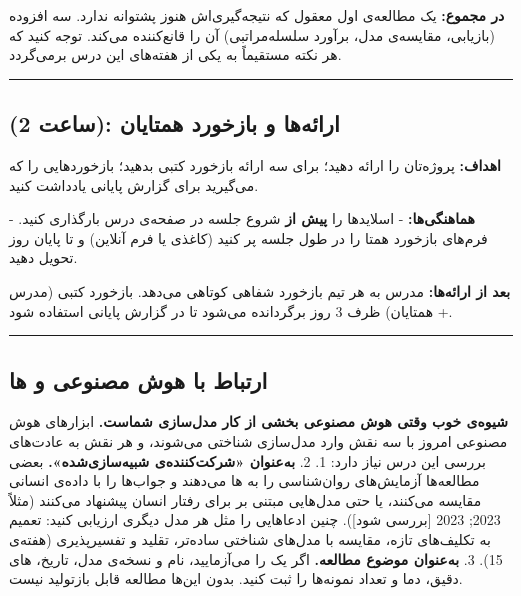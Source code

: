 \textbf{در مجموع:} یک مطالعه‌ی اول معقول که نتیجه‌گیری‌اش هنوز پشتوانه
ندارد. سه افزوده (بازیابی، مقایسه‌ی مدل، برآورد سلسله‌مراتبی) آن را
قانع‌کننده می‌کند. توجه کنید که هر نکته مستقیماً به یکی از هفته‌های این درس
برمی‌گردد.

\begin{center}\rule{0.5\linewidth}{0.5pt}\end{center}

\subsection{\texorpdfstring{ (2 ساعت): ارائه‌ها و بازخورد
همتایان}{lab (2 ساعت): ارائه‌ها و بازخورد همتایان}}

\textbf{اهداف:} پروژه‌تان را ارائه دهید؛ برای سه ارائه بازخورد کتبی
بدهید؛ بازخوردهایی را که می‌گیرید برای گزارش پایانی یادداشت کنید.

\textbf{هماهنگی‌ها:} - اسلایدها  را \textbf{پیش از} شروع جلسه
در صفحه‌ی درس بارگذاری کنید. - فرم‌های بازخورد همتا را در طول جلسه پر کنید
(کاغذی یا فرم آنلاین) و تا پایان روز تحویل دهید.

\textbf{بعد از ارائه‌ها:} مدرس به هر تیم بازخورد شفاهی کوتاهی می‌دهد.
بازخورد کتبی (مدرس + همتایان) ظرف 3 روز برگردانده می‌شود تا در گزارش
پایانی استفاده شود.

\begin{center}\rule{0.5\linewidth}{0.5pt}\end{center}

\subsection{\texorpdfstring{ارتباط با هوش مصنوعی و
ها}{ارتباط با هوش مصنوعی و LLMها}}

\textbf{شیوه‌ی خوب وقتی هوش مصنوعی بخشی از کار مدل‌سازی شماست.} ابزارهای
هوش مصنوعی امروز با سه نقش وارد مدل‌سازی شناختی می‌شوند، و هر نقش به
عادت‌های بررسی این درس نیاز دارد: 1. 2. \textbf{به‌عنوان «شرکت‌کننده‌ی
شبیه‌سازی‌شده».} بعضی مطالعه‌ها آزمایش‌های روان‌شناسی را به ها می‌دهند
و جواب‌ها را با داده‌ی انسانی مقایسه می‌کنند، یا حتی مدل‌هایی مبتنی بر
 برای رفتار انسان پیشنهاد می‌کنند (مثلاً  \lr{\&} 
2023;  2023 {[}بررسی شود{]}). چنین ادعاهایی را مثل
هر مدل دیگری ارزیابی کنید: تعمیم به تکلیف‌های تازه، مقایسه با مدل‌های
شناختی ساده‌تر، تقلید  و تفسیرپذیری (هفته‌ی 15). 3.
\textbf{به‌عنوان موضوع مطالعه.} اگر یک  را می‌آزمایید، نام و نسخه‌ی
مدل، تاریخ، های دقیق، دما و تعداد نمونه‌ها را ثبت کنید. بدون
این‌ها مطالعه قابل بازتولید نیست.

